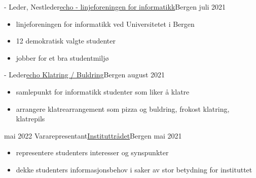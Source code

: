 %
%
%


\begin{experiences}
  \simpleexperience
    {-}   {Leder, Nestleder}{\href{https://echo.uib.no/om-echo/studentgrupper/2022-2023}{echo - linjeforeningen for informatikk}}{Bergen}
    {juli 2021} {
                      \begin{itemize}
                        \item linjeforeningen for informatikk ved Universitetet i Bergen
                        \item 12 demokratisk valgte studenter
                        \item jobber for et bra studentmiljø
                      \end{itemize}
                    }
                
  \emptySeparator
  
    \simpleexperience
    {-}   {Leder}{\href{https://echo.uib.no/om-echo/studentgrupper/echo-klatring-buldring}{echo Klatring / Buldring}}{Bergen}
    {august 2021} {
                      \begin{itemize}
                      \item samlepunkt for informatikk studenter som liker å klatre 
                        \item  arrangere klatrearrangement som pizza og buldring, frokost klatring, klatrepils  
                      \end{itemize}
                    }
    
  \emptySeparator
  
  
\simpleexperience
    {mai 2022}   {Vararepresentant}{\href{https://echo.uib.no/om-echo/instituttraadet}{Instituttrådet}}{Bergen}
    {mai 2021} { 
                    \begin{itemize}
                        \item representere studenters interesser og synspunkter
                        \item dekke studenters informasjonsbehov i saker av stor betydning for instituttet
                     \end{itemize}
    }
                    

\end{experiences}
